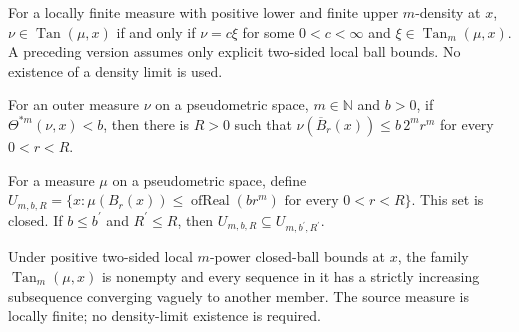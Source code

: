 \begin{lemma}
\label{lem:tangent-ray-density-bounds}

For a locally finite measure with positive lower and finite upper $m$-density at $x$, $\nu\in\operatorname{Tan}(\mu,x)$ if and only if $\nu=c\xi$ for some $0<c<\infty$ and $\xi\in\operatorname{Tan}_m(\mu,x)$. A preceding version assumes only explicit two-sided local ball bounds. No existence of a density limit is used.
\end{lemma}

\begin{lemma}
\label{lem:quantitative-upper-density-bound}

For an outer measure $\nu$ on a pseudometric space, $m\in\mathbb N$ and $b>0$, if $\Theta^{*m}(\nu,x)<b$, then there is $R>0$ such that $\nu(\overline B_r(x))\le b\,2^m r^m$ for every $0<r<R$.
\end{lemma}

\begin{lemma}
\label{lem:closed-upper-ball-bound-sets}

For a measure $\mu$ on a pseudometric space, define $U_{m,b,R}=\{x: \mu(B_r(x))\le\operatorname{ofReal}(b r^m)\text{ for every }0<r<R\}$. This set is closed. If $b\le b^{\prime}$ and $R^{\prime}\le R$, then $U_{m,b,R}\subseteq U_{m,b^{\prime},R^{\prime}}$.
\end{lemma}

\begin{lemma}
\label{lem:dimensional-family-compact-ball-bounds}

Under positive two-sided local $m$-power closed-ball bounds at $x$, the family $\operatorname{Tan}_m(\mu,x)$ is nonempty and every sequence in it has a strictly increasing subsequence converging vaguely to another member. The source measure is locally finite; no density-limit existence is required.
\end{lemma}

